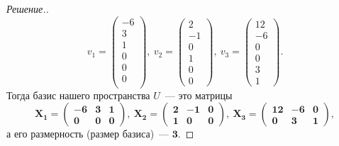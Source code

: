 \documentclass[a4paper]{article}
\theoremstyle{remark}
\begin{document}
\begin{proof}[Решение.]
        \begin{equation*}
          v_1 = \begin{pmatrix}
            -6 \\
            3 \\
            1 \\
            0 \\
            0 \\
            0 \\
          \end{pmatrix},\ v_2 = \begin{pmatrix}
            2 \\
            -1 \\
            0 \\
            1 \\
            0 \\
            0
          \end{pmatrix},\ v_3 = \begin{pmatrix}
            12 \\
            -6 \\
            0 \\
            0 \\
            3 \\
            1
          \end{pmatrix}.
        \end{equation*}
        Тогда базис нашего пространства $U$~--- это матрицы 
        \begin{equation*}
          \bm{X_1} = \begin{pmatrix}
            \bm{-6} & \bm{3} & \bm{1} \\
            \bm{0} & \bm{0} & \bm{0}
          \end{pmatrix},\ \bm{X_2} = \begin{pmatrix}
            \bm{2} & \bm{-1} & \bm{0} \\
            \bm{1} & \bm{0} & \bm{0}
          \end{pmatrix},\ \bm{X_3} = \begin{pmatrix}
            \bm{12} & \bm{-6} & \bm{0} \\
            \bm{0} & \bm{3} & \bm{1}
          \end{pmatrix},
        \end{equation*}
        а его размерность (размер базиса)~--- $\bm{3}$.

      \end{proof}
    
\end{document}
